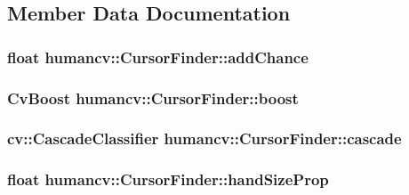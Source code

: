 \subsection{Member Data Documentation}
\hypertarget{classhumancv_1_1_cursor_finder_ad7607c9dd807d16db9cda9cea42e8dcb}{
\subsubsection[{add\-Chance}]{\setlength{\rightskip}{0pt plus 5cm}float {\bf humancv\-::\-Cursor\-Finder\-::add\-Chance}}}\label{classhumancv_1_1_cursor_finder_ad7607c9dd807d16db9cda9cea42e8dcb}
\hypertarget{classhumancv_1_1_cursor_finder_ae280f7953be6afdbd23469443cadfb4b}{
\subsubsection[{boost}]{\setlength{\rightskip}{0pt plus 5cm}Cv\-Boost {\bf humancv\-::\-Cursor\-Finder\-::boost}}}\label{classhumancv_1_1_cursor_finder_ae280f7953be6afdbd23469443cadfb4b}
\hypertarget{classhumancv_1_1_cursor_finder_a5dd2e09ff9ca7e0667d0267d571a31ff}{
\subsubsection[{cascade}]{\setlength{\rightskip}{0pt plus 5cm}cv\-::\-Cascade\-Classifier {\bf humancv\-::\-Cursor\-Finder\-::cascade}}}\label{classhumancv_1_1_cursor_finder_a5dd2e09ff9ca7e0667d0267d571a31ff}
\hypertarget{classhumancv_1_1_cursor_finder_a647e0325a998393648793c069524454d}{
\subsubsection[{hand\-Size\-Prop}]{\setlength{\rightskip}{0pt plus 5cm}float {\bf humancv\-::\-Cursor\-Finder\-::hand\-Size\-Prop}}}\label{classhumancv_1_1_cursor_finder_a647e0325a998393648793c069524454d}
